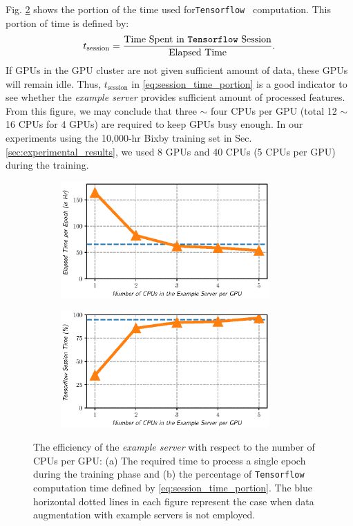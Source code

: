 \documentclass{article}
\begin{document}
Fig. \ref{fig:plot_gpu_time_percentage} shows the portion of the time
used for{\tt Tensorflow } computation. This portion of time is defined
by:
\begin{align}
  t_{\text{session}} =  \frac{\text{Time Spent in {\tt Tensorflow}
  Session}}{\text{Elapsed Time}}.
  \label{eq:session_time_portion}
\end{align}
If GPUs in the GPU cluster are not given sufficient amount 
of data, these GPUs will remain idle. Thus, $t_{\text{session}}$ in
\eqref{eq:session_time_portion} is a good indicator to 
see whether the {\it example server } 
provides sufficient 
amount of processed features. From this figure, we may conclude that
three $\sim$ four CPUs per GPU (total 12 $\sim$ 16 CPUs for 4 GPUs) 
are required to keep GPUs busy enough. In our experiments using
the 10,000-hr Bixby training set in Sec. \ref{sec:experimental_results},
we used 8 GPUs and 40 CPUs (5 CPUs per GPU) during the training.

\begin{figure}
  \captionsetup[subfigure]{justification=centering}
    \centering
    \begin{subfigure}[5]{0.5\textwidth}
      {\includegraphics[width=80mm]{../figures/plot_example_server_time}}
      \caption{
          \label{fig:plot_example_server_time}
      }
    \end{subfigure}

    \begin{subfigure}[b]{0.5\textwidth} 
      {\includegraphics[width=80mm]{../figures/plot_gpu_time_percentage}}
    \caption{
      \label{fig:plot_gpu_time_percentage}
    }
    \end{subfigure}
  \caption{\label{fig:plot_example_server_performance}
  The efficiency of the {\it example server} with respect to
  the number of CPUs per GPU: (a) The required time to 
  process a single epoch during the training phase and (b) 
  the percentage of {\tt Tensorflow } computation time defined by 
  \eqref{eq:session_time_portion}. 
  The blue horizontal dotted lines in each figure represent the case
  when data augmentation with example servers is not employed.
  }
\end{figure}
\end{document}
